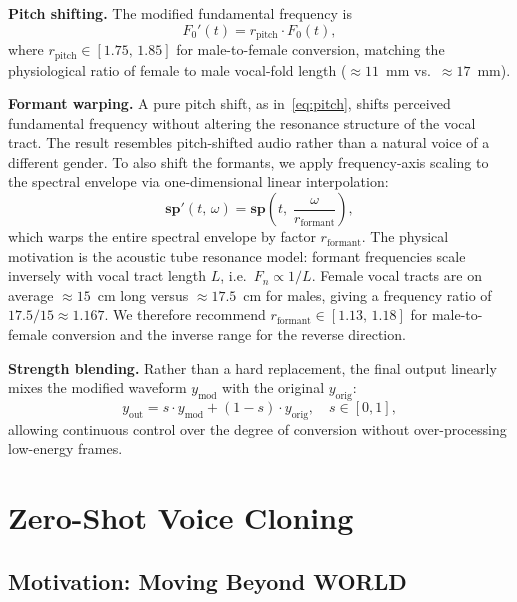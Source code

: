\documentclass[conference]{IEEEtran}
\begin{document}
\textbf{Pitch shifting.}
The modified fundamental frequency is
\begin{equation}
  F_0'(t) = r_\text{pitch} \cdot F_0(t),
  \label{eq:pitch}
\end{equation}
where $r_\text{pitch}\in[1.75,\,1.85]$ for male-to-female conversion,
matching the physiological ratio of female to male vocal-fold length
(${\approx}11$~mm vs.\ ${\approx}17$~mm).

\textbf{Formant warping.}
A pure pitch shift, as in~\eqref{eq:pitch}, shifts perceived
fundamental frequency without altering the resonance structure of
the vocal tract.  The result resembles pitch-shifted audio rather than
a natural voice of a different gender.
To also shift the formants, we apply frequency-axis scaling to the
spectral envelope via one-dimensional linear interpolation:
\begin{equation}
  \mathbf{sp}'(t,\,\omega) =
    \mathbf{sp}\!\left(t,\;\frac{\omega}{r_\text{formant}}\right),
  \label{eq:formant}
\end{equation}
which warps the entire spectral envelope by factor $r_\text{formant}$.
The physical motivation is the acoustic tube resonance model:
formant frequencies scale inversely with vocal tract length $L$,
i.e.\ $F_n \propto 1/L$.  Female vocal tracts are on average
${\approx}15$~cm long versus ${\approx}17.5$~cm for males, giving a
frequency ratio of $17.5/15 \approx 1.167$.  We therefore recommend
$r_\text{formant}\in[1.13,\,1.18]$ for male-to-female conversion and
the inverse range for the reverse direction.

\textbf{Strength blending.}
Rather than a hard replacement, the final output linearly mixes the
modified waveform $y_\text{mod}$ with the original $y_\text{orig}$:
\begin{equation}
  y_\text{out} = s \cdot y_\text{mod} + (1-s) \cdot y_\text{orig},
  \quad s \in [0,1],
  \label{eq:blend}
\end{equation}
allowing continuous control over the degree of conversion without
over-processing low-energy frames.

\section{Zero-Shot Voice Cloning}
\label{sec:cloning}

\subsection{Motivation: Moving Beyond WORLD}
\end{document}
